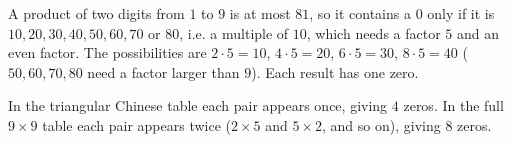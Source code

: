 A product of two digits from $1$ to $9$ is at most $81$, so it contains a $0$ only if it is $10,20,30,40,50,60,70$ or $80$, i.e. a multiple of $10$, which needs a factor $5$ and an even factor. The possibilities are $2\cdot5=10$, $4\cdot5=20$, $6\cdot5=30$, $8\cdot5=40$ ($50,60,70,80$ need a factor larger than $9$). Each result has one zero.

In the triangular Chinese table each pair appears once, giving $\boxed{4}$ zeros. In the full $9\times9$ table each pair appears twice ($2\times5$ and $5\times2$, and so on), giving $8$ zeros.
